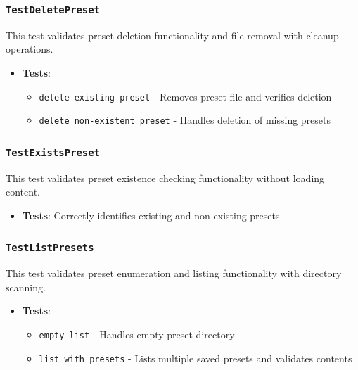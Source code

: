 \subsubsection*{\texttt{TestDeletePreset}}
This test validates preset deletion functionality and file removal with cleanup operations.
\begin{itemize}
    \item \textbf{Tests}:
    \begin{itemize}
        \item \texttt{delete existing preset} - Removes preset file and verifies deletion
        \item \texttt{delete non-existent preset} - Handles deletion of missing presets
    \end{itemize}
\end{itemize}

\subsubsection*{\texttt{TestExistsPreset}}
This test validates preset existence checking functionality without loading content.
\begin{itemize}
    \item \textbf{Tests}: Correctly identifies existing and non-existing presets
\end{itemize}

\subsubsection*{\texttt{TestListPresets}}
This test validates preset enumeration and listing functionality with directory scanning.
\begin{itemize}
    \item \textbf{Tests}:
    \begin{itemize}
        \item \texttt{empty list} - Handles empty preset directory
        \item \texttt{list with presets} - Lists multiple saved presets and validates contents
    \end{itemize}
\end{itemize}
